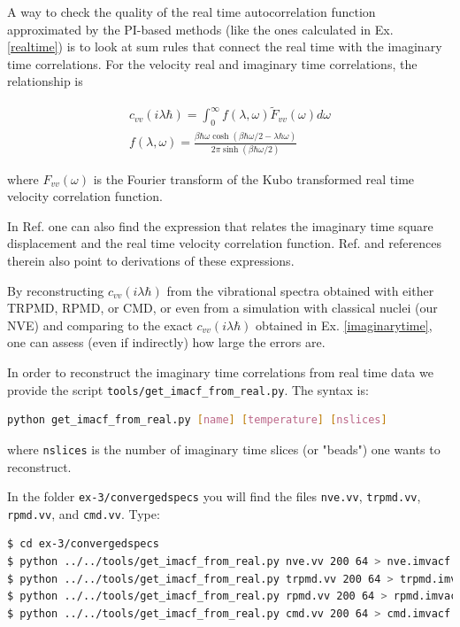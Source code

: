 \documentclass{article}
\begin{document}
\begin{Exercise}[label={relationship},title={Relationship between imaginary and real time correlations}]

A way to check the quality of the real time autocorrelation function approximated by the PI-based methods (like the ones calculated in Ex. \ref{realtime}) is to look at sum rules that connect the real time with the imaginary time correlations. For the velocity real and imaginary time correlations, the relationship is

\begin{eqnarray}
c_{vv}(i \lambda \hbar)=\int_0^\infty f(\lambda, \omega) \tilde{F}_{vv}(\omega) d\omega \\
f(\lambda, \omega)=\frac{\beta\hbar\omega\cosh(\beta\hbar\omega/2-\lambda\hbar\omega)}{2\pi\sinh(\beta\hbar\omega/2)}
\end{eqnarray}

\noindent where $F_{vv}(\omega)$ is the Fourier transform of the Kubo transformed real time velocity correlation function.

In Ref. \cite{tuck08book} one can also find the expression that relates the imaginary time square displacement and the real time velocity correlation function. Ref. \cite{habe+07jcp} and references therein also point to derivations of these expressions. 

By reconstructing $c_{vv}(i \lambda \hbar)$ from the vibrational spectra obtained with either TRPMD, RPMD, or CMD, or even from a simulation with classical nuclei (our NVE) and comparing to the exact $c_{vv}(i \lambda \hbar)$ obtained in Ex. \ref{imaginarytime}, one can assess (even if indirectly) how large the errors are. 

In order to reconstruct the imaginary time correlations from real time data we provide the script \texttt{tools/get\_imacf\_from\_real.py}. The syntax is:

\begin{lstlisting}[language=Bash]
python get_imacf_from_real.py [name] [temperature] [nslices]
\end{lstlisting}

\noindent where \texttt{nslices} is the number of imaginary time slices (or "beads") one wants to reconstruct.

In the folder \texttt{ex-3/convergedspecs} you will find the files \texttt{nve.vv}, \texttt{trpmd.vv}, \texttt{rpmd.vv}, and \texttt{cmd.vv}. Type:

\begin{lstlisting}[language=Bash,emph={\$}]
$ cd ex-3/convergedspecs
$ python ../../tools/get_imacf_from_real.py nve.vv 200 64 > nve.imvacf
$ python ../../tools/get_imacf_from_real.py trpmd.vv 200 64 > trpmd.imvacf
$ python ../../tools/get_imacf_from_real.py rpmd.vv 200 64 > rpmd.imvacf
$ python ../../tools/get_imacf_from_real.py cmd.vv 200 64 > cmd.imvacf
\end{lstlisting}


\end{Exercise}
\end{document}
